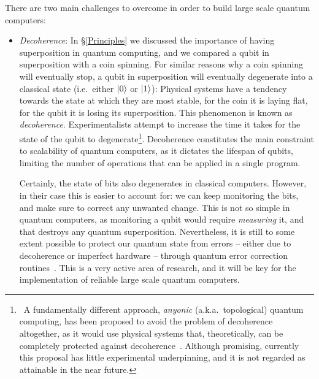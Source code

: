 There are two main challenges to overcome in order to build large scale quantum computers:

\begin{itemize}

\item \textit{Decoherence}: In \S\ref{Principles} we discussed the importance of having superposition in quantum computing, and we compared a qubit in superposition with a coin spinning. For similar reasons why a coin spinning will eventually stop, a qubit in superposition will eventually degenerate into a classical state (i.e.\ either \(\vert 0 \rangle\) or \(\vert 1 \rangle\)): Physical systems have a tendency towards the state at which they are most stable, for the coin it is laying flat, for the qubit it is losing its superposition. This phenomenon is known as \textit{decoherence}. Experimentalists attempt to increase the time it takes for the state of the qubit to degenerate\footnote{\, A fundamentally different approach, \textit{anyonic} (a.k.a.\ topological) quantum computing, has been proposed to avoid the problem of decoherence altogether, as it would use physical systems that, theoretically, can be completely protected against decoherence~\citep{Anyonic}. Although promising, currently this proposal has little experimental underpinning, and it is not regarded as attainable in the near future.}. Decoherence constitutes the main constraint to scalability of quantum computers, as it dictates the lifespan of qubits, limiting the number of operations that can be applied in a single program. 

Certainly, the state of bits also degenerates in classical computers. However, in their case this is easier to account for: we can keep monitoring the bits, and make sure to correct any unwanted change. This is not so simple in quantum computers, as monitoring a qubit would require \textit{measuring} it, and that destroys any quantum superposition. Nevertheless, it is still to some extent possible to protect our quantum state from errors -- either due to decoherence or imperfect hardware -- through quantum error correction routines~\citep{QuantumErrorCorrection}. This is a very active area of research, and it will be key for the implementation of reliable large scale quantum computers.



\end{itemize}
